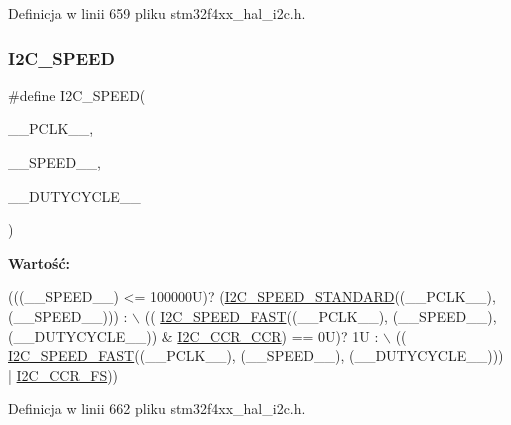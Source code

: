 Definicja w linii 659 pliku stm32f4xx\+\_\+hal\+\_\+i2c.\+h.

\mbox{\label{group___i2_c___private___macros_ga0e871b470a0f7a9d641156f07e37c810}} 
\subsubsection{\texorpdfstring{I2\+C\+\_\+\+S\+P\+E\+ED}{I2C\_SPEED}}
{\footnotesize\ttfamily \#define I2\+C\+\_\+\+S\+P\+E\+ED(\begin{DoxyParamCaption}\item[{}]{\+\_\+\+\_\+\+P\+C\+L\+K\+\_\+\+\_\+,  }\item[{}]{\+\_\+\+\_\+\+S\+P\+E\+E\+D\+\_\+\+\_\+,  }\item[{}]{\+\_\+\+\_\+\+D\+U\+T\+Y\+C\+Y\+C\+L\+E\+\_\+\+\_\+ }\end{DoxyParamCaption})}

{\bfseries Wartość\+:}
\begin{DoxyCode}
(((\_\_SPEED\_\_) <= 100000U)? (\hyperlink{group___i2_c___private___macros_gaa71590c93b126e79fc86afbc819742b3}{I2C\_SPEED\_STANDARD}((\_\_PCLK\_\_), (\_\_SPEED\_\_))) : \(\backslash\)
                                                                  ((
      \hyperlink{group___i2_c___private___macros_ga9e5a85344d70ab05020e41ba24566f57}{I2C\_SPEED\_FAST}((\_\_PCLK\_\_), (\_\_SPEED\_\_), (\_\_DUTYCYCLE\_\_)) & 
      \hyperlink{group___peripheral___registers___bits___definition_ga5c8cb2bd83dd7dbdcf6ca4bbf4a841de}{I2C\_CCR\_CCR}) == 0U)? 1U : \(\backslash\)
                                                                  ((
      \hyperlink{group___i2_c___private___macros_ga9e5a85344d70ab05020e41ba24566f57}{I2C\_SPEED\_FAST}((\_\_PCLK\_\_), (\_\_SPEED\_\_), (\_\_DUTYCYCLE\_\_))) | 
      \hyperlink{group___peripheral___registers___bits___definition_gaea64e5d7eba609ac9a84964bc0bc2def}{I2C\_CCR\_FS}))
\end{DoxyCode}


Definicja w linii 662 pliku stm32f4xx\+\_\+hal\+\_\+i2c.\+h.

\mbox{\label{group___i2_c___private___macros_ga9e5a85344d70ab05020e41ba24566f57}} 
